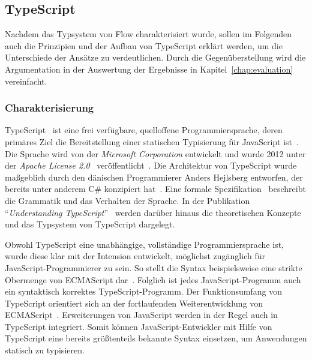 \subsection{TypeScript}
\label{sec:typescript}

Nachdem das Typsystem von Flow charakterisiert wurde, sollen im Folgenden auch die Prinzipien und der Aufbau von TypeScript erklärt werden, um die Unterschiede der Ansätze zu verdeutlichen. Durch die Gegenüberstellung wird die Argumentation in der Auswertung der Ergebnisse in Kapitel~\ref{chap:evaluation} vereinfacht.

\subsubsection{Charakterisierung}

TypeScript~\autocite{TYPESCRIPT:SPEC} ist eine frei verfügbare, quelloffene Programmiersprache, deren primäres Ziel die Bereitstellung einer statischen Typisierung für JavaScript ist~\autocite[2]{BIERMAN:2014}. Die Sprache wird von der \textit{Microsoft Corporation} entwickelt und wurde 2012 unter der \textit{Apache License 2.0}~\autocite{LICENSE:APACHE20} veröffentlicht~\autocite{TYPESCRIPT:GITHUB}. Die Architektur von TypeScript wurde maßgeblich durch den dänischen Programmierer Anders Hejlsberg entworfen, der bereits unter anderem C\# konzipiert hat~\autocite{GITHUB:HEJLSBERG}. Eine formale Spezifikation~\autocite{TYPESCRIPT:SPEC} beschreibt die Grammatik und das Verhalten der Sprache. In der Publikation \enquote{\textit{Understanding TypeScript}}~\autocite{BIERMAN:2014} werden darüber hinaus die theoretischen Konzepte und das Typsystem von TypeScript dargelegt.

Obwohl TypeScript eine unabhängige, vollständige Programmiersprache ist, wurde diese klar mit der Intension entwickelt, möglichst zugänglich für JavaScript-Programmierer zu sein. So stellt die Syntax beispielsweise eine strikte Obermenge von ECMAScript dar~\autocite[25]{FLOW:PAPER}. Folglich ist jedes JavaScript-Programm auch ein syntaktisch korrektes TypeScript-Programm. Der Funktionsumfang von TypeScript orientiert sich an der fortlaufenden Weiterentwicklung von ECMAScript~\autocite[1]{BIERMAN:2014}. Erweiterungen von JavaScript werden in der Regel auch in TypeScript integriert. Somit können JavaScript-Entwickler mit Hilfe von TypeScript eine bereits größtenteils bekannte Syntax einsetzen, um Anwendungen statisch zu typisieren.

